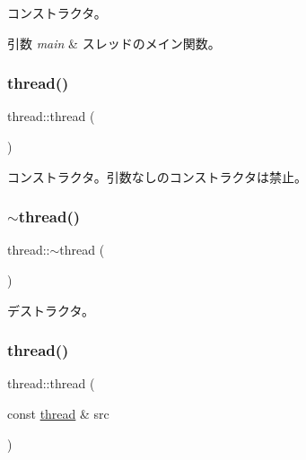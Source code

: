 コンストラクタ。 
\begin{DoxyParams}{引数}
{\em main} & スレッドのメイン関数。 \\
\hline
\end{DoxyParams}
\hypertarget{classthread_a210d87437e34573c32fc8d3f93963bfe}{}\label{classthread_a210d87437e34573c32fc8d3f93963bfe} 
\subsubsection{\texorpdfstring{thread()}{thread()}\hspace{0.1cm}{\footnotesize\ttfamily [2/4]}}
{\footnotesize\ttfamily thread\+::thread (\begin{DoxyParamCaption}{ }\end{DoxyParamCaption})\hspace{0.3cm}{\ttfamily [delete]}}

コンストラクタ。引数なしのコンストラクタは禁止。 \hypertarget{classthread_a117e0892c1d1a90bece03424311676f6}{}\label{classthread_a117e0892c1d1a90bece03424311676f6} 
\subsubsection{\texorpdfstring{$\sim$thread()}{~thread()}}
{\footnotesize\ttfamily thread\+::$\sim$thread (\begin{DoxyParamCaption}{ }\end{DoxyParamCaption})\hspace{0.3cm}{\ttfamily [virtual]}}

デストラクタ。 \hypertarget{classthread_a2debe550e8c36b7c7bafde6861527b6a}{}\label{classthread_a2debe550e8c36b7c7bafde6861527b6a} 
\subsubsection{\texorpdfstring{thread()}{thread()}\hspace{0.1cm}{\footnotesize\ttfamily [3/4]}}
{\footnotesize\ttfamily thread\+::thread (\begin{DoxyParamCaption}\item[{const \hyperlink{classthread}{thread} \&}]{src }\end{DoxyParamCaption})\hspace{0.3cm}{\ttfamily [delete]}}

